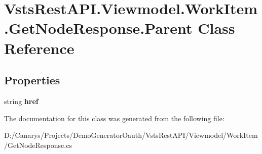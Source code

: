 \hypertarget{class_vsts_rest_a_p_i_1_1_viewmodel_1_1_work_item_1_1_get_node_response_1_1_parent}{}\section{Vsts\+Rest\+A\+P\+I.\+Viewmodel.\+Work\+Item.\+Get\+Node\+Response.\+Parent Class Reference}
\label{class_vsts_rest_a_p_i_1_1_viewmodel_1_1_work_item_1_1_get_node_response_1_1_parent}
\subsection*{Properties}
\begin{DoxyCompactItemize}
\item 
\mbox{\label{class_vsts_rest_a_p_i_1_1_viewmodel_1_1_work_item_1_1_get_node_response_1_1_parent_a6bc834fb37470016bb61b09b632e477f}} 
string {\bfseries href}
\end{DoxyCompactItemize}


The documentation for this class was generated from the following file\+:\begin{DoxyCompactItemize}
\item 
D\+:/\+Canarys/\+Projects/\+Demo\+Generator\+Oauth/\+Vsts\+Rest\+A\+P\+I/\+Viewmodel/\+Work\+Item/Get\+Node\+Response.\+cs\end{DoxyCompactItemize}
